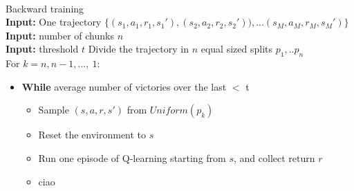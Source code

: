 \documentclass{exam}
\begin{document}
\begin{problem}[Introduction]
\ \newline

    Backward training\\
    \textbf{Input:} One trajectory $\{ (s_1, a_1, r_1, s_1'), (s_2, a_2, r_2, s_2') ), ... (s_M, a_M, r_M, s_M') \}$ \\ 
    \textbf{Input:} number of chunks $n$\\
    \textbf{Input:} threshold $t$
    Divide the trajectory in $n$ equal sized splits $p_1, .. p_n$\\
    For $k=n, n-1,  ..., \  1 $:
    \begin{itemize}[noitemsep, nolistsep]
        \item \textbf{While} average number of victories over the last $<$ t\\
        \begin{itemize}[noitemsep,nolistsep]
            \item[ ] Sample $(s, a, r, s') $ from $Uniform(p_k)$\\
            \item[ ] Reset the environment to $s$\\
            \item[ ] Run one episode of Q-learning starting from $s$, and collect return $r$\\
            \item[ ] ciao
        \end{itemize}
    \end{itemize}
    
    
\end{problem}




\end{document}
